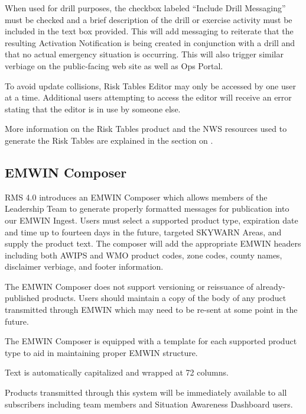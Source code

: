 \documentclass[pdflatex,letterpaper,twoside,12pt]{book}
\begin{document}
When used for drill purposes, the checkbox labeled ``Include Drill Messaging'' must be checked and a brief description of the drill or exercise activity must be included in the text box provided.  This will add messaging to reiterate that the resulting Activation Notification is being created in conjunction with a drill and that no actual emergency situation is occurring.  This will also trigger similar verbiage on the public-facing web site as well as Ops Portal.

To avoid update collisions, Risk Tables Editor may only be accessed by one user at a time.  Additional users attempting to access the editor will receive an error stating that the editor is in use by someone else.

More information on the Risk Tables product and the NWS resources used to generate the Risk Tables are explained in the section on .

\subsection{EMWIN Composer}\label{ops-emwin-composer}

RMS 4.0 introduces an EMWIN Composer which allows members of the Leadership Team to generate properly formatted messages for publication into our EMWIN Ingest.  Users must select a supported product type, expiration date and time up to fourteen days in the future, targeted SKYWARN Areas, and supply the product text.  The composer will add the appropriate EMWIN headers including both AWIPS and WMO product codes, zone codes, county names, disclaimer verbiage, and footer information.

The EMWIN Composer does not support versioning or reissuance of already-published products.  Users should maintain a copy of the body of any product transmitted through EMWIN which may need to be re-sent at some point in the future.

The EMWIN Composer is equipped with a template for each supported product type to aid in maintaining proper EMWIN structure.

Text is automatically capitalized and wrapped at 72 columns.

Products transmitted through this system will be immediately available to all subscribers including team members and Situation Awareness Dashboard users.




\end{document}
